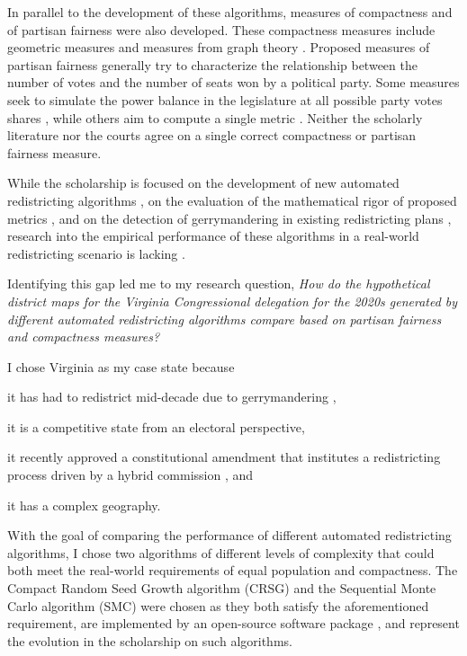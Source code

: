 In parallel to the development of these algorithms, measures of compactness and of partisan fairness were also developed. These compactness measures include geometric measures \parencite[e.g.][]{polsby1991, schwartzberg1966,harris1964, maceachren1985, reock1961, boyce1964} and measures from graph theory \parencite[e.g.][]{dube2016}. Proposed measures of partisan fairness generally try to characterize the relationship between the number of votes and the number of seats won by a political party. Some measures seek to simulate the power balance in the legislature at all possible party votes shares \parencite[e.g.][]{tufte1973}, while others aim to compute a single metric \parencite[e.g.][]{stephanopoulos2014,katz2020,warrington2018,mcdonald2015,wang2016}. Neither the scholarly literature nor the courts agree on a single correct compactness or partisan fairness measure. 

While the scholarship is focused on the development of new automated redistricting algorithms \parencite{fifield2020}, on the evaluation of the mathematical rigor of proposed metrics \parencite[see][]{katz2020}, and on the detection of gerrymandering in existing redistricting plans \parencite[e.g.][]{herschlag2017, duchin2018a}, research into the empirical performance of these algorithms in a real-world redistricting scenario is lacking \parencite{fifield2020a}.

Identifying this gap led me to my research question, \emph{How do the hypothetical district maps for the Virginia Congressional delegation for the 2020s generated by different automated redistricting algorithms compare based on partisan fairness and compactness measures?}

I chose Virginia as my case state because 
\begin{seriate}
    \item it has had to redistrict mid-decade due to gerrymandering \parencite[see][]{2016a},
    \item it is a competitive state from an electoral perspective, 
    \item it recently approved a constitutional amendment that institutes a redistricting process driven by a hybrid commission \parencite{ballotpediastaff2020}, and
    \item it has a complex geography.
\end{seriate}

With the goal of comparing the performance of different automated redistricting algorithms, I chose two algorithms of different levels of complexity that could both meet the real-world requirements of equal population and compactness. The Compact Random Seed Growth algorithm (CRSG) \parencite{chen2013} and the Sequential Monte Carlo algorithm (SMC) \parencite{mccartan2020} were chosen as they both satisfy the aforementioned requirement, are implemented by an open-source software package \parencite{fifield2020d}, and represent the evolution in the scholarship on such algorithms. 

